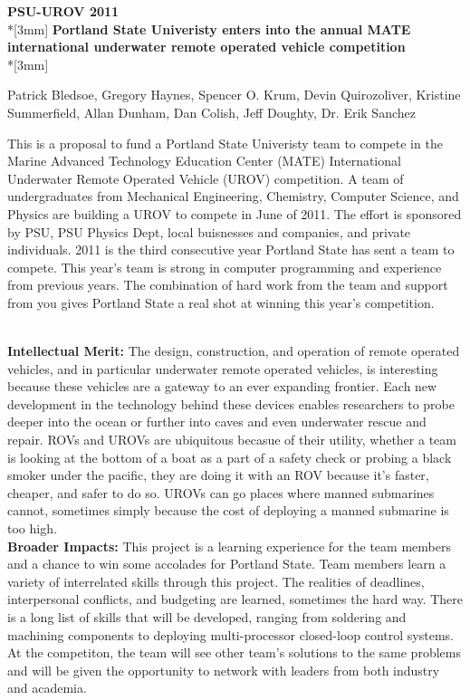 \documentclass{proposalnsf}
\begin{document}
\begin{center}
{\Large{\bf PSU-UROV 2011}}\\*[3mm]
{\bf Portland State Univeristy enters into the annual MATE international underwater remote operated vehicle competition} \\*[3mm]

Patrick Bledsoe, Gregory Haynes, Spencer O. Krum, Devin Quirozoliver, Kristine Summerfield,
 Allan Dunham, Dan Colish, Jeff Doughty, Dr. Erik Sanchez

\end{center}


This is a  proposal to fund a Portland State Univeristy team to compete in the Marine Advanced Technology Education Center (MATE)
 International Underwater Remote Operated Vehicle (UROV) competition. A team of undergraduates from Mechanical Engineering,
 Chemistry, Computer Science, and Physics are building a UROV to compete in June of 2011. The effort is sponsored by PSU, 
PSU Physics Dept, local buisnesses and companies, and private individuals. 2011 is the third consecutive year Portland State has sent 
a team to compete.  This year's team is strong in computer programming and experience from previous years. The combination of hard work 
from the team and support from you gives Portland State a real shot at winning this year's competition.  



\ \\
\noindent
{\bf Intellectual Merit:}
The design, construction, and operation of remote operated vehicles, and in particular underwater remote operated vehicles, is interesting
because these vehicles are a gateway to an ever expanding frontier. Each new development in the technology behind these devices enables 
researchers to probe deeper into the ocean or further into caves and even underwater rescue and repair. ROVs and UROVs are ubiquitous becasue 
of their utility, whether a team is looking at the bottom of a boat as a part of a safety check or probing a black smoker under the pacific, 
they are doing it with an ROV because it's faster, cheaper, and safer to do so. UROVs can go places where manned submarines cannot, sometimes 
simply because the cost of deploying a manned submarine is too high.  
\ \\

\noindent
{\bf Broader Impacts:}
This project is a learning experience for the team members and a chance to win some accolades for Portland State. Team members learn 
a variety of interrelated skills through this project. The realities of deadlines, interpersonal conflicts, and budgeting are learned, 
sometimes the hard way. There is a long list of skills that will be developed, ranging from soldering and machining components to deploying 
multi-processor closed-loop control systems. At the competiton, the team will see other team's solutions to the same problems and will be
 given the opportunity to network with leaders from both industry and academia. 
\renewcommand{\thepage} {B--\arabic{page}}
\end{document}
